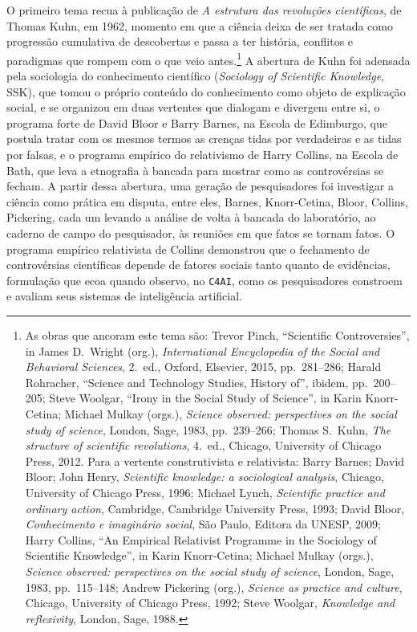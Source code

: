 O primeiro tema recua à publicação de \textit{A estrutura das revoluções científicas}, de Thomas Kuhn, em 1962, momento em que a ciência deixa de ser tratada como progressão cumulativa de descobertas e passa a ter história, conflitos e paradigmas que rompem com o que veio antes.\footnote{As obras que ancoram este tema são: Trevor Pinch, \enquote{Scientific Controversies}, in James D.~Wright (org.), \textit{International Encyclopedia of the Social and Behavioral Sciences}, 2.~ed., Oxford, Elsevier, 2015, pp.~281--286; Harald Rohracher, \enquote{Science and Technology Studies, History of}, ibidem, pp.~200--205; Steve Woolgar, \enquote{Irony in the Social Study of Science}, in Karin Knorr-Cetina; Michael Mulkay (orgs.), \textit{Science observed: perspectives on the social study of science}, London, Sage, 1983, pp.~239--266; Thomas S.~Kuhn, \textit{The structure of scientific revolutions}, 4.~ed., Chicago, University of Chicago Press, 2012. Para a vertente construtivista e relativista: Barry Barnes; David Bloor; John Henry, \textit{Scientific knowledge: a sociological analysis}, Chicago, University of Chicago Press, 1996; Michael Lynch, \textit{Scientific practice and ordinary action}, Cambridge, Cambridge University Press, 1993; David Bloor, \textit{Conhecimento e imaginário social}, São Paulo, Editora da UNESP, 2009; Harry Collins, \enquote{An Empirical Relativist Programme in the Sociology of Scientific Knowledge}, in Karin Knorr-Cetina; Michael Mulkay (orgs.), \textit{Science observed: perspectives on the social study of science}, London, Sage, 1983, pp.~115--148; Andrew Pickering (org.), \textit{Science as practice and culture}, Chicago, University of Chicago Press, 1992; Steve Woolgar, \textit{Knowledge and reflexivity}, London, Sage, 1988.} A abertura de Kuhn foi adensada pela sociologia do conhecimento científico (\textit{Sociology of Scientific Knowledge}, SSK), que tomou o próprio conteúdo do conhecimento como objeto de explicação social, e se organizou em duas vertentes que dialogam e divergem entre si, o programa forte de David Bloor e Barry Barnes, na Escola de Edimburgo, que postula tratar com os mesmos termos as crenças tidas por verdadeiras e as tidas por falsas, e o programa empírico do relativismo de Harry Collins, na Escola de Bath, que leva a etnografia à bancada para mostrar como as controvérsias se fecham. A partir dessa abertura, uma geração de pesquisadores foi investigar a ciência como prática em disputa, entre eles, Barnes, Knorr-Cetina, Bloor, Collins, Pickering, cada um levando a análise de volta à bancada do laboratório, ao caderno de campo do pesquisador, às reuniões em que fatos se tornam fatos. O programa empírico relativista de Collins demonstrou que o fechamento de controvérsias científicas depende de fatores sociais tanto quanto de evidências, formulação que ecoa quando observo, no \texttt{C4AI}, como os pesquisadores constroem e avaliam seus sistemas de inteligência artificial.

